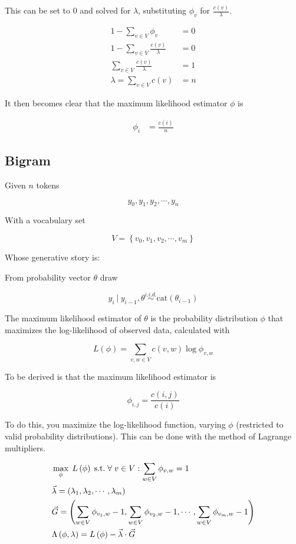\documentclass[11pt]{article}
\begin{document}
This can be set to $0$ and solved for $\lambda$, substituting $\phi_{v}$ for $ \frac{c \left( v \right)}{\lambda}$.

\begin{align*}
1 - \sum \limits_{v \in V} \phi_{v} &= 0 \\
%
1 - \sum \limits_{v \in V} \frac{c \left( v \right)}{\lambda} &= 0 \\
%
\sum \limits_{v \in V} \frac{c \left( v \right)}{\lambda} &= 1 \\
%
\lambda = \sum \limits_{v \in V} c \left( v \right) &= n
\end{align*}

It then becomes clear that the maximum likelihood estimator $\phi$ is

\begin{align*}
\phi_i &= \frac{c \left( i \right)}{n}
\end{align*}
%
%
%
\subsection{Bigram}

Given $n$ tokens

$$ y_0, y_1, y_2, \cdots, y_n $$

With a vocabulary set

$$ V = \left\{ v_0, v_1, v_2, \cdots, v_m \right\} $$

Whose generative story is:

From probability vector $\theta$ draw

$$ y_i \: \lvert \: y_{i - 1}, \theta \stackrel{i.i.d.}{\sim} \text{cat} \left( \theta_{i - 1} \right) $$

The maximum likelihood estimator of $\theta$ is the probability distribution $\phi$ that maximizes the log-likelihood of observed data, calculated with

$$ L \left( \phi \right) = \sum \limits_{v, w \in V} c \left( v, w \right) \log{\phi_{v, w}} $$

To be derived is that the maximum likelihood estimator is

$$\phi_{i, j} = \frac{c \left( i, j \right)}{ c \left( i \right)}$$

To do this, you maximize the log-likelihood function, varying $\phi$ (restricted to valid probability distributions). This can be done with the method of Lagrange multipliers.

\begin{align*}
&\max \limits_{\phi} \; L\left( \phi \right) \; \text{s.t.} \; \forall \; v \in V : \sum \limits_{w \in V} \phi_{v, w} = 1 \\
%
&\vec{\lambda} = \left( \lambda_1, \lambda_2, \cdots , \lambda_m \right) \notag \\
%
&\vec{G} = \left( \sum \limits_{w \in V} \phi_{v_1, w} - 1, \sum \limits_{w \in V} \phi_{v_2, w} - 1, \cdots , \sum \limits_{w \in V} \phi_{v_m, w} - 1 \right) \\
%
&\Lambda \left( \phi, \lambda \right) = L\left( \phi \right) - \vec{\lambda} \cdot \vec{G}
\end{align*}
\end{document}
